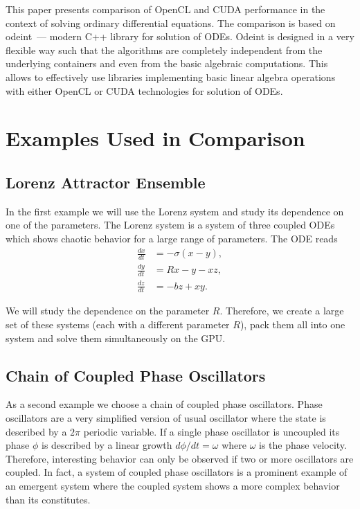 \documentclass[1p]{elsarticle}
\begin{document}
This paper presents comparison of OpenCL and CUDA performance in the context of
solving ordinary differential equations. The comparison is based on odeint~---
modern C++ library for solution of ODEs. Odeint is designed in a very flexible
way such that the algorithms are completely independent from the underlying
containers and even from the basic algebraic computations. This allows to
effectively use libraries implementing basic linear algebra operations with
either OpenCL or CUDA technologies for solution of ODEs.

\section{Examples Used in Comparison}

\subsection{Lorenz Attractor Ensemble}

In the first example we will use the Lorenz system and study its dependence on
one of the parameters. The Lorenz system is a system of three coupled ODEs
which shows chaotic behavior for a large range of parameters. The ODE reads
\begin{align}
    \frac{dx}{dt} &= -\sigma \left( x - y \right), \\
    \frac{dy}{dt} &= R x - y - xz, \\
    \frac{dz}{dt} &= -bz + xy.
\end{align}

We will study the dependence on the parameter $R$. Therefore, we create a large
set of these systems (each with a different parameter $R$), pack them all into
one system and solve them simultaneously on the GPU.

\subsection{Chain of Coupled Phase Oscillators}

As a second example we choose a chain of coupled phase oscillators. Phase
oscillators are a very simplified version of usual oscillator where the state
is described by a $2\pi$ periodic variable. If a single phase oscillator is
uncoupled its phase $\phi$ is described by a linear growth $d\phi/dt = \omega$
where $\omega$ is the phase velocity. Therefore, interesting behavior can only
be observed if two or more oscillators are coupled. In fact, a system of
coupled phase oscillators is a prominent example of an emergent system where
the coupled system shows a more complex behavior than its constitutes.
\end{document}
